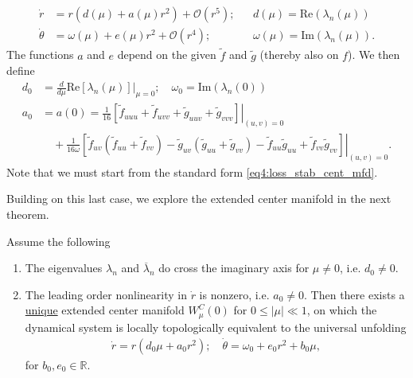 \begin{enumerate}
\begin{subequations}
\begin{align}
	\dot{r}&= r\left(d(\mu )+a(\mu )r^2\right) + \mathcal{O}(r^5); &&d(\mu )=  \textrm{Re} (\lambda _n(\mu )) \\
	\dot{\theta } &= \omega(\mu ) + e( \mu )r^2 + \mathcal{O}(r^4);&&\omega(\mu )=  \textrm{Im} (\lambda _n(\mu )).
\end{align}\end{subequations}
The functions $a$ and $e$ depend on the given $\tilde{f}$ and $\tilde{g}$ (thereby also on $f$). We then define
\begin{subequations}
\begin{align}
	d_0 &= \frac{d}{d\mu } \textrm{Re} \left.\left[ \lambda _n(\mu ) \right] \right|_{\mu =0}; 
		\quad \omega_0= \textrm{Im} (\lambda_n(0 ))\\
		a_0 &= a(0) = \frac{1}{16}\left. \left[\tilde{f}_{uuu} + \tilde{f}_{uvv} + \tilde{g}_{uuv} + \tilde{g}_{vvv}\right] \right|_{(u,v)=0} \\
		    &\quad +\frac{1}{16\omega } \left. \left[\tilde{f}_{uv}(\tilde{f}_{uu}+ \tilde{f}_{vv}) - \tilde{g}_{uv}(\tilde{g}_{uu}+\tilde{g}_{vv}) - \tilde{f}_{uu} \tilde{g}_{uu} + \tilde{f}_{vv}\tilde{g}_{vv}\right]\right|_{(u,v)=0}.
\end{align}
\end{subequations}
Note that we must start from the standard form \eqref{eq4:loss_stab_cent_mfd}. 
\end{enumerate}
Building on this last case, we explore the extended center manifold in the next theorem.

\begin{theorem}
	Assume the following
	\begin{enumerate}
		\item The eigenvalues $\lambda_n$ and $\overline{\lambda}_{n} $ do cross the imaginary axis for $\mu \neq 0$, i.e. $d_0 \neq 0$.
		\item The leading order nonlinearity in $\dot{r}$ is nonzero, i.e. $a_0 \neq 0$.
			Then there exists a \underline{unique} extended center manifold $W^{C}_{\mu }(0)$ for $0 \leq |\mu | \ll 1$, on which the dynamical system is locally topologically equivalent to the universal unfolding 
			\begin{align}
			\boxed{
			\dot{r} = r \left( d_0 \mu + a_0 r^2\right); \quad 
			\dot{\theta}= \omega_0 + e_0r^2 + b_0 \mu ,}
			\end{align}
		for $b_0, e_0 \in \mathbb{R}$.	
	\end{enumerate}
\end{theorem}

